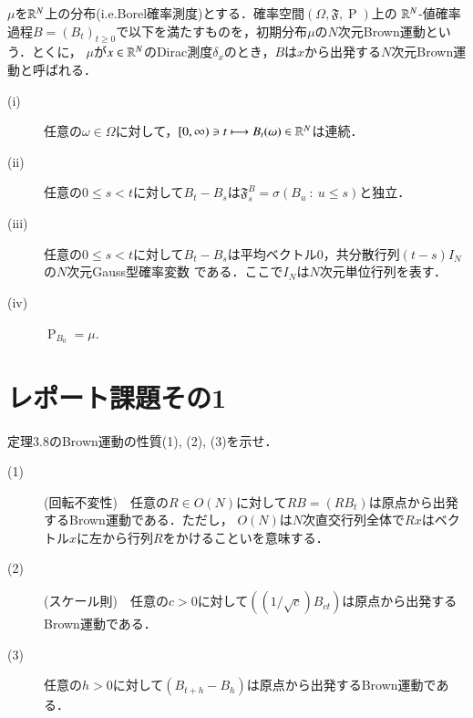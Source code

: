 \begin{dfn}
	$\mu$を$\mathbb{R}^N$上の分布(i.e.Borel確率測度)とする．確率空間$(\Omega, \mathfrak{F}, \operatorname{P})$上の
	$\mathbb{R}^N$-値確率過程$B = (B_t)_{t \geq 0}$で以下を満たすものを，初期分布$\mu$の$N$次元Brown運動という．とくに，
	$\mu$が$x \in \mathbb{R}^N$のDirac測度$\delta_x$のとき，$B$は$x$から出発する$N$次元Brown運動と呼ばれる．
	\begin{description}
		\item[\rm{(i)}] 任意の$\omega \in \Omega$に対して，$[0,\infty) \ni t \longmapsto B_t(\omega) \in \mathbb{R}^N$は連続．
		\item[\rm{(ii)}] 任意の$0 \leq s < t$に対して$B_t - B_s$は$\mathfrak{F}_s^B = \sigma(B_u\ :\ u \leq s)$と独立．
		\item[\rm{(iii)}] 任意の$0 \leq s < t$に対して$B_t - B_s$は平均ベクトル0，共分散行列$(t-s)I_N$の$N$次元Gauss型確率変数
			である．ここで$I_N$は$N$次元単位行列を表す．
		\item[\rm{(iv)}] $\operatorname{P}_{B_0} = \mu$.
	\end{description}
\end{dfn}

\section{レポート課題その1}


定理3.8のBrown運動の性質(1), (2), (3)を示せ．

\begin{description}
	\item[(1)](回転不変性)　任意の$R \in O(N)$に対して$RB = (RB_t)$は原点から出発するBrown運動である．ただし，
		$O(N)$は$N$次直交行列全体で$Rx$はベクトル$x$に左から行列$R$をかけることいを意味する．
	\item[(2)](スケール則)　任意の$c > 0$に対して$((1/\sqrt{c})B_{ct})$は原点から出発するBrown運動である．
	\item[(3)] 任意の$h > 0$に対して$(B_{t+h} - B_h)$は原点から出発するBrown運動である．
\end{description}

